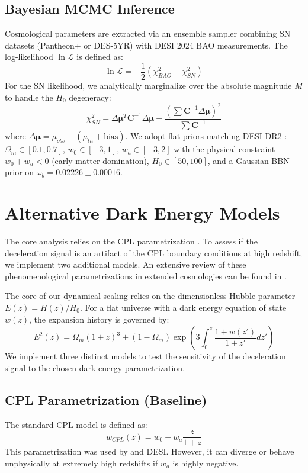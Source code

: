 \documentclass[12pt, a4paper]{article}
\begin{document}
\subsection{Bayesian MCMC Inference}
Cosmological parameters are extracted via an ensemble sampler combining SN datasets (Pantheon+ or DES-5YR) with DESI 2024 BAO measurements. The log-likelihood $\ln \mathcal{L}$ is defined as:
\begin{equation}
\ln \mathcal{L} = -\frac{1}{2} (\chi^2_{BAO} + \chi^2_{SN})
\end{equation}
For the SN likelihood, we analytically marginalize over the absolute magnitude $M$ to handle the $H_0$ degeneracy:
\begin{equation}
\chi^2_{SN} = \Delta \boldsymbol{\mu}^T \mathbf{C}^{-1} \Delta \boldsymbol{\mu} - \frac{(\sum \mathbf{C}^{-1} \Delta \boldsymbol{\mu})^2}{\sum \mathbf{C}^{-1}}
\end{equation}
where $\Delta \boldsymbol{\mu} = \mu_{obs} - (\mu_{th} + \text{bias})$. We adopt flat priors matching DESI DR2 \citep{desibao2025}: $\Omega_m \in [0.1, 0.7]$, $w_0 \in [-3, 1]$, $w_a \in [-3, 2]$ with the physical constraint $w_0 + w_a < 0$ (early matter domination), $H_0 \in [50, 100]$, and a Gaussian BBN prior on $\omega_b = 0.02226 \pm 0.00016$.

\section{Alternative Dark Energy Models}
The core analysis relies on the CPL parametrization \citep{chevallier2001, linder2003}. To assess if the deceleration signal is an artifact of the CPL boundary conditions at high redshift, we implement two additional models. An extensive review of these phenomenological parametrizations in extended cosmologies can be found in \citet{arora2025}.

The core of our dynamical scaling relies on the dimensionless Hubble parameter $E(z) = H(z)/H_0$. For a flat universe with a dark energy equation of state $w(z)$, the expansion history is governed by:\begin{equation}E^2(z) = \Omega_m(1+z)^3 + (1-\Omega_m) \exp \left( 3 \int_0^z \frac{1+w(z')}{1+z'} dz' \right)\end{equation}We implement three distinct models to test the sensitivity of the deceleration signal to the chosen dark energy parametrization.

\subsection{CPL Parametrization (Baseline)}
The standard CPL model is defined as:
\begin{equation}
    w_{CPL}(z) = w_0 + w_a \frac{z}{1+z}
\end{equation}
This parametrization was used by \citet{son2025} and DESI. However, it can diverge or behave unphysically at extremely high redshifts if $w_a$ is highly negative.
\end{document}
